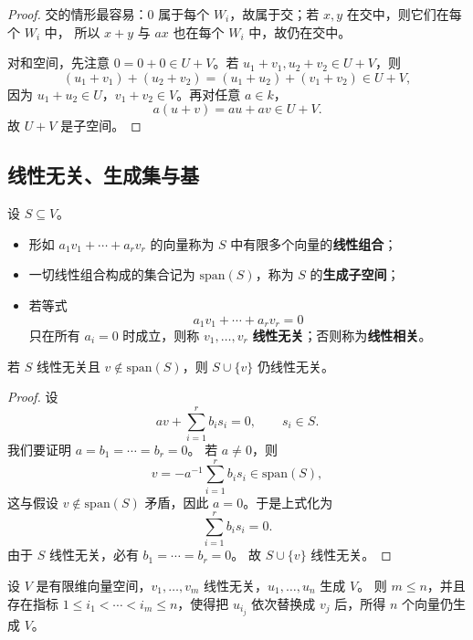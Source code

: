\begin{proof}
交的情形最容易：$0$ 属于每个 $W_i$，故属于交；若 $x,y$ 在交中，则它们在每个 $W_i$ 中，
所以 $x+y$ 与 $ax$ 也在每个 $W_i$ 中，故仍在交中。

对和空间，先注意 $0=0+0\in U+V$。若 $u_1+v_1,u_2+v_2\in U+V$，则
\[
  (u_1+v_1)+(u_2+v_2)=(u_1+u_2)+(v_1+v_2)\in U+V,
\]
因为 $u_1+u_2\in U$，$v_1+v_2\in V$。再对任意 $a\in k$，
\[
  a(u+v)=au+av\in U+V.
\]
故 $U+V$ 是子空间。
\end{proof}

\subsection{线性无关、生成集与基}

\begin{definition}
设 $S\subseteq V$。
\begin{itemize}
  \item 形如 $a_1v_1+\cdots+a_rv_r$ 的向量称为 $S$ 中有限多个向量的\textbf{线性组合}；
  \item 一切线性组合构成的集合记为 $\mathrm{span}(S)$，称为 $S$ 的\textbf{生成子空间}；
  \item 若等式
  \[
    a_1v_1+\cdots+a_rv_r=0
  \]
  只在所有 $a_i=0$ 时成立，则称 $v_1,\dots,v_r$ \textbf{线性无关}；否则称为\textbf{线性相关}。
\end{itemize}
\end{definition}

\begin{proposition}
若 $S$ 线性无关且 $v\notin \mathrm{span}(S)$，则 $S\cup\{v\}$ 仍线性无关。
\end{proposition}

\begin{proof}
设
\[
  a v + \sum_{i=1}^r b_i s_i = 0,
  \qquad s_i\in S.
\]
我们要证明 $a=b_1=\cdots=b_r=0$。
若 $a\neq 0$，则
\[
  v = -a^{-1}\sum_{i=1}^r b_i s_i \in \mathrm{span}(S),
\]
这与假设 $v\notin \mathrm{span}(S)$ 矛盾，因此 $a=0$。于是上式化为
\[
  \sum_{i=1}^r b_i s_i=0.
\]
由于 $S$ 线性无关，必有 $b_1=\cdots=b_r=0$。
故 $S\cup\{v\}$ 线性无关。
\end{proof}

\begin{theorem}[替换定理]
设 $V$ 是有限维向量空间，$v_1,\dots,v_m$ 线性无关，$u_1,\dots,u_n$ 生成 $V$。
则 $m\le n$，并且存在指标 $1\le i_1<\cdots<i_m\le n$，使得把
$u_{i_j}$ 依次替换成 $v_j$ 后，所得 $n$ 个向量仍生成 $V$。
\end{theorem}

